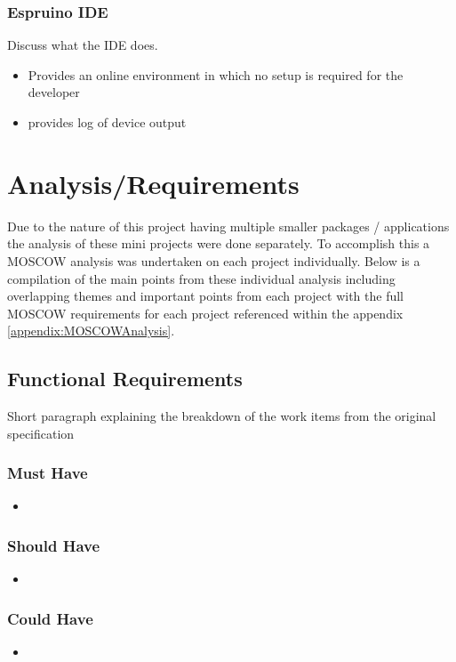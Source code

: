 \documentclass{l4proj}
\begin{document}
\subsection{Espruino IDE}
Discuss what the IDE does.
\begin{itemize}
    \item Provides an online environment in which no setup is required for the developer 
    \item provides log of device output
    
\end{itemize}

\chapter{Analysis/Requirements}

\text Due to the nature of this project having multiple smaller packages / applications the analysis of these mini projects were done separately. To accomplish this a MOSCOW analysis was undertaken on each project individually. Below is a compilation of the main points from these individual analysis including overlapping themes and important points from each project with the full MOSCOW requirements for each project referenced within the appendix \ref{appendix:MOSCOWAnalysis}.

\section{Functional Requirements}
Short paragraph explaining the breakdown of the work items from the original specification
\subsection{Must Have}
\begin{itemize}
    \item 
\end{itemize}
\subsection{Should Have}
\begin{itemize}
    \item 
\end{itemize}
\subsection{Could Have}
\begin{itemize}
    \item 
\end{itemize}
\end{document}
